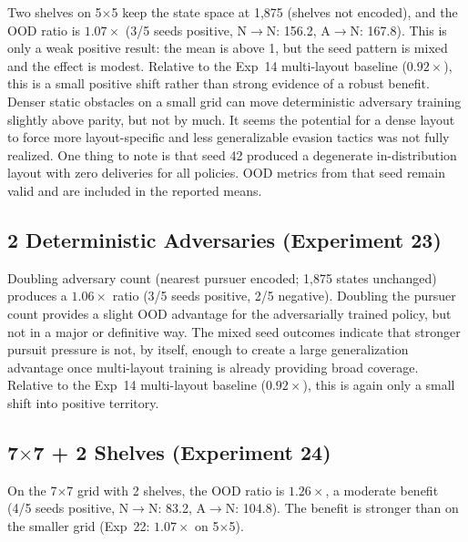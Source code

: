 \documentclass[sigconf]{aamas}
\begin{document}
Two shelves on 5$\times$5 keep the state space at 1{,}875 (shelves not encoded),
and the OOD ratio is $1.07\times$ (3/5 seeds positive, N$\to$N: 156.2, A$\to$N:
167.8). This is only a weak positive result: the mean is above 1, but the seed
pattern is mixed and the effect is modest. Relative to the Exp~14 multi-layout
baseline ($0.92\times$), this is a small positive shift rather than strong
evidence of a robust benefit. Denser static obstacles on a small grid can move deterministic adversary
training slightly above parity, but not by much. It seems the potential for a
dense layout to force more layout-specific and less generalizable evasion tactics was not fully realized.
One thing to note is that seed 42 produced a degenerate in-distribution layout with
zero deliveries for all policies. OOD metrics from that seed remain valid and are
included in the reported means.


\subsection{2 Deterministic Adversaries (Experiment 23)}

Doubling adversary count (nearest pursuer encoded; 1{,}875 states unchanged)
produces a $1.06\times$ ratio (3/5 seeds positive, 2/5 negative). Doubling the
pursuer count provides a slight OOD advantage for the adversarially trained policy, but not in a major or definitive way. 
The mixed seed outcomes indicate that stronger pursuit
pressure is not, by itself, enough to create a large generalization advantage
once multi-layout training is already providing broad coverage. Relative to the
Exp~14 multi-layout baseline ($0.92\times$), this is again only a small shift
into positive territory. 

\subsection{7$\times$7 + 2 Shelves (Experiment 24)}

On the 7$\times$7 grid with 2 shelves, the OOD ratio is $1.26\times$, a moderate
benefit (4/5 seeds positive, N$\to$N: 83.2, A$\to$N: 104.8). The benefit is stronger
than on the smaller grid (Exp~22: $1.07\times$ on 5$\times$5).
\end{document}
